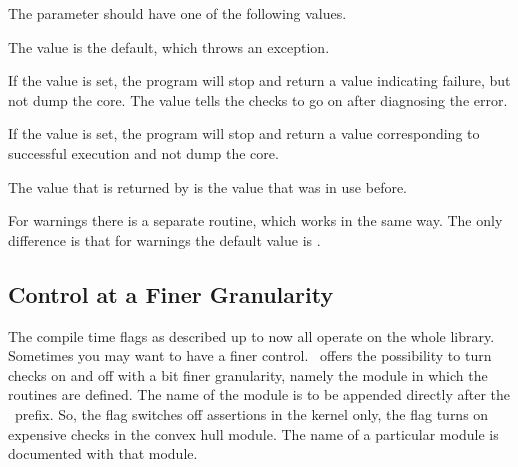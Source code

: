 
\ccGlueBegin
{}
\ccGlueEnd

The parameter should have one of the following values.

The  value is the default, which throws an exception.

If the  value is set, the program will stop and return a value 
indicating failure, but not dump the core. 
The  value tells the checks to go on after diagnosing the error.

\begin{ccAdvanced}
If the  value is set, the program will stop and 
return a value corresponding to successful execution and not dump the core. 
\end{ccAdvanced}

The value that is returned by  is the value that was in use before.

For warnings there is a separate routine, which works in the same way.
The only difference is that for warnings the default value is
.

\ccGlueBegin
{}
\ccGlueEnd

\subsection{Control at a Finer Granularity}

The compile time flags as described up to now all operate on the whole 
library.
Sometimes you may want to have a finer control.
\cgal\ offers the possibility to turn checks on and off with a bit finer
granularity, namely the module in which the routines are defined.
The name of the module is to be appended directly after the \cgal\ prefix.
So, the flag  switches off assertions in 
the kernel only, the flag  turns on
expensive checks in the convex hull module.
The name of a particular module is documented with that module.

